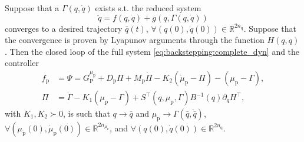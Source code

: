 \begin{theorem}\label{theorem:backstepping:backstepping_controller}
	Suppose that a $\Gamma(q,\dot{q})$ exists s.t. the reduced system
	\begin{equation}\label{eq:backstepping:reduced_sys}
		\ddot{q} = f(q,\dot{q}) + g(q,\Gamma(q,\dot{q}))
	\end{equation}
	converges to a desired trajectory $\bar{q}(t)$, $\forall (q(0),\dot{q}(0)) \in \mathbb{R}^{2 n_{\mathrm{q}}}$. Suppose that the convergence is proven by Lyapunov arguments through the function $H(q,\dot{q})$. Then the closed loop of the full system \eqref{eq:backstepping:complete_dyn} and the controller
	\begin{equation}\label{eq:backstepping:pi_psi}
		\begin{split}
			f_\mathrm{p} &= \Psi = G_{\mathrm{P}}^{\mu_\mathrm{p}} + D_\mathrm{p} \Pi + M_\mathrm{p} \dot{\Pi} - K_2 (\dot{\mu}_\mathrm{p} - \Pi) - (\mu_\mathrm{p} - \Gamma),\\
			\Pi &= \dot{\Gamma} - K_1 (\mu_\mathrm{p} - \Gamma) 
			+ S^{\top}(q,\mu_\mathrm{p},\Gamma)B^{-1}(q)\partial_{\dot{q}} H^{\top},
		\end{split}
	\end{equation}
	with $K_1,K_2 \succ 0$, is such that $q \rightarrow \bar{q}$ and $\mu_\mathrm{p} \rightarrow \Gamma(\bar q,\dot{\bar q})$, $\forall (\mu_\mathrm{p}(0),\dot{\mu}_\mathrm{p}(0)) \in \mathbb{R}^{2n_{\mu_\mathrm{p}}}$, and $\forall (q(0),\dot{q}(0)) \in \mathbb{R}^{2 n_{\mathrm{q}}}$.
\end{theorem}
